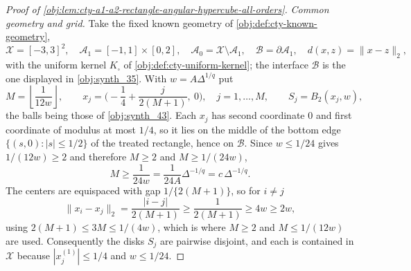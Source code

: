 \documentclass[11pt]{article}
\begin{document}
\begin{proof}[Proof of \cref{obj:lem:cty-a1-a2-rectangle-angular-hypercube-all-orders}]
\emph{Common geometry and grid.}
Take the fixed known geometry of \cref{obj:def:cty-known-geometry},
\[
\mathcal X=[-3,3]^2,
\quad
\mathcal A_1=[-1,1]\times[0,2],
\quad
\mathcal A_0=\mathcal X\setminus\mathcal A_1,
\quad
\mathcal B=\partial\mathcal A_1,
\quad
d(x,z)=\lVert x-z\rVert_2,
\]
with the uniform kernel \(K_\square\) of \cref{obj:def:cty-uniform-kernel}; the interface \(\mathcal B\) is the one displayed in \cref{obj:synth_35}.  With \(w=A\Delta^{1/q}\) put
\[
M=\left\lfloor\frac1{12w}\right\rfloor,
\qquad
x_j=\bigl(-\frac14+\frac{j}{2(M+1)},\ 0\bigr),
\quad j=1,\ldots,M,
\qquad
S_j=B_2(x_j,w),
\]
the balls being those of \cref{obj:synth_43}.
Each \(x_j\) has second coordinate \(0\) and first coordinate of modulus at most \(1/4\), so it lies on the middle of the bottom edge \(\{(s,0):|s|\leq1/2\}\) of the treated rectangle, hence on \(\mathcal B\).
Since \(w\leq1/24\) gives \(1/(12w)\geq2\) and therefore \(M\geq2\) and \(M\geq 1/(24w)\),
\[
M\geq\frac1{24w}=\frac1{24A}\Delta^{-1/q}=c\,\Delta^{-1/q}.
\]
The centers are equispaced with gap \(1/\{2(M+1)\}\), so for \(i\neq j\)
\[
\lVert x_i-x_j\rVert_2=\frac{|i-j|}{2(M+1)}\geq\frac1{2(M+1)}\geq 4w\geq 2w,
\]
using \(2(M+1)\leq3M\leq 1/(4w)\), which is where \(M\geq2\) and \(M\leq1/(12w)\) are used.
Consequently the disks \(S_j\) are pairwise disjoint, and each is contained in \(\mathcal X\) because \(|x_j^{(1)}|\leq1/4\) and \(w\leq1/24\).


\end{proof}
\end{document}
